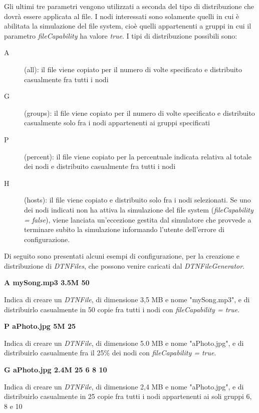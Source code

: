Gli ultimi tre parametri vengono utilizzati a seconda del tipo di distribuzione che dovrà  essere applicata al file. I nodi interessati sono solamente quelli in cui è abilitata la simulazione del file system, cioè quelli appartenenti a gruppi in cui il parametro \textit{fileCapability} ha valore \textit{true}. I tipi di distribuzione possibili sono:
\begin{description}
\item[A] (all): il file viene copiato per il numero di volte specificato e distribuito casualmente fra tutti i nodi
\item[G] (groups): il file viene copiato per il numero di volte specificato e distribuito casualmente solo fra i nodi appartenenti ai gruppi specificati
\item[P] (percent): il file viene copiato per la percentuale indicata relativa al totale dei nodi e distribuito casualmente fra tutti i nodi
\item[H] (hosts): il file viene copiato e distribuito solo fra i nodi selezionati. Se uno dei nodi indicati non ha attiva la simulazione del file system (\textit{fileCapability = false}), viene lanciata un'eccezione gestita dal simulatore che provvede a terminare subito la simulazione informando l'utente dell'errore di configurazione.
\end{description}

Di seguito sono presentati alcuni esempi di configurazione, per la creazione e distribuzione di \textit{DTNFiles}, che possono venire caricati dal \textit{DTNFileGenerator}.

\begin{center}
\textbf{A	mySong.mp3	3.5M	50}
\end{center}
Indica di creare un \textit{DTNFile}, di dimensione 3,5 MB e nome "mySong.mp3", e di distribuirlo casualmente in 50 copie fra tutti i nodi con \textit{fileCapability = true}.
\\

\begin{center}
\textbf{P	aPhoto.jpg	5M	25}
\end{center}
Indica di creare un \textit{DTNFile}, di dimensione 5.0 MB e nome "aPhoto.jpg", e di distribuirlo casualmente fra il 25\% dei nodi con \textit{fileCapability = true}.
\\

\begin{center}
\textbf{G	aPhoto.jpg	2.4M	25	6	8	10}
\end{center}
Indica di creare un \textit{DTNFile}, di dimensione 2,4 MB e nome "aPhoto.jpg", e di distribuirlo casualmente in 25 copie fra tutti i nodi appartenenti ai soli gruppi 6, 8 e 10
\\

